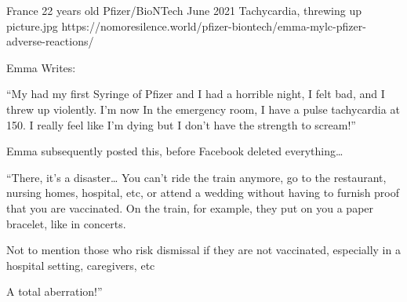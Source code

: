 {France}
{22 years old}
{Pfizer/BioNTech}
{June 2021}
{Tachycardia, threwing up}
{picture.jpg}
{https://nomoresilence.world/pfizer-biontech/emma-mylc-pfizer-adverse-reactions/}
{


Emma Writes:

“My had my first Syringe of Pfizer and I had a horrible night, I felt bad, and I threw up violently. I’m now In the emergency room, I have a pulse tachycardia at 150. I really feel like I’m dying but I don’t have the strength to scream!”

Emma subsequently posted this, before Facebook deleted everything…

“There, it’s a disaster… You can’t ride the train anymore, go to the restaurant, nursing homes, hospital, etc, or attend a wedding without having to furnish proof that you are vaccinated. On the train, for example, they put on you a paper bracelet, like in concerts.

Not to mention those who risk dismissal if they are not vaccinated, especially in a hospital setting, caregivers, etc

A total aberration!”
}

